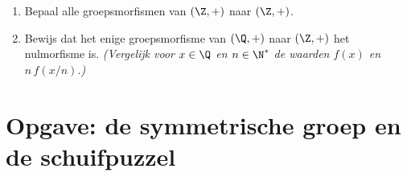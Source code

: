 \begin{exercise}[$\star\star$]\label{exo:b1:structures:12}
\begin{enumerate}
  \item Bepaal alle groepsmorfismen van $(\Z, +)$ naar $(\Z, +)$.
  \item Bewijs dat het enige groepsmorfisme van $(\Q, +)$ naar $(\Z, +)$
        het nulmorfisme is. \emph{(Vergelijk voor $x \in \Q$ en $n \in
        \N^*$ de waarden $f(x)$ en $n\,f(x/n)$.)}
\end{enumerate}
\end{exercise}

\section{Opgave: de symmetrische groep en de schuifpuzzel}

